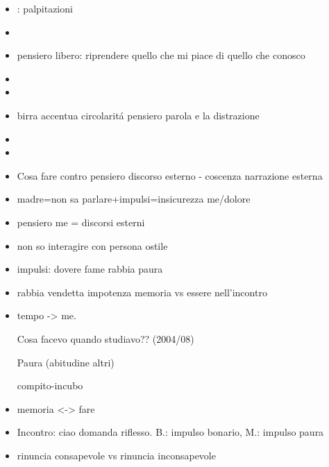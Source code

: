 \begin{itemize}
\item {}: palpitazioni

\item {}

\item pensiero libero: riprendere quello che mi piace di quello che conosco

\item {}

\item {}

\item birra accentua circolarit\'a pensiero parola e la distrazione

\item {}

\item {}

\item Cosa fare contro pensiero discorso esterno - coscenza narrazione esterna
\item madre=non sa parlare+impulsi=insicurezza me/dolore 

\item pensiero me = discorsi esterni

\item non so interagire con persona ostile

\item impulsi: dovere fame rabbia paura 

\item rabbia vendetta impotenza memoria vs essere nell'incontro

\item tempo -> me.

Cosa facevo quando studiavo?? (2004/08)

Paura (abitudine altri)

compito-incubo

\item memoria <-> fare

\item Incontro: ciao domanda riflesso. B.: impulso bonario, M.: impulso paura

\item rinuncia consapevole vs rinuncia inconsapevole


\end{itemize}
